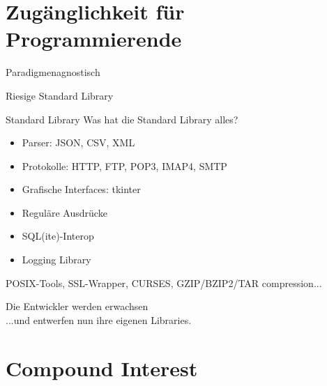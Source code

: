 \documentclass{beamer}
\begin{document}
\section{Zug\"anglichkeit f\"ur Programmierende}

\begin{frame}
\begin{center}
\Huge Paradigmenagnostisch
\end{center}
\end{frame}

\begin{frame}
\begin{center}
\Huge Riesige Standard Library
\end{center}
\end{frame}

\begin{frame}{Standard Library}
Was hat die Standard Library alles?
\pause
\begin{itemize}
\item Parser: JSON, CSV, XML
\pause
\item Protokolle: HTTP, FTP, POP3, IMAP4, SMTP
\pause
\item Grafische Interfaces: tkinter
\pause
\item Regul\"are Ausdr\"ucke
\pause
\item SQL(ite)-Interop
\pause
\item Logging Library
\pause
\end{itemize}
POSIX-Tools, SSL-Wrapper, CURSES, GZIP/BZIP2/TAR compression...
\end{frame}

\begin{frame}
\begin{center}
{ \Huge Die Entwickler werden erwachsen}\\
...und entwerfen nun ihre eigenen Libraries.
\end{center}
\end{frame}

\section{Compound Interest}
\end{document}
